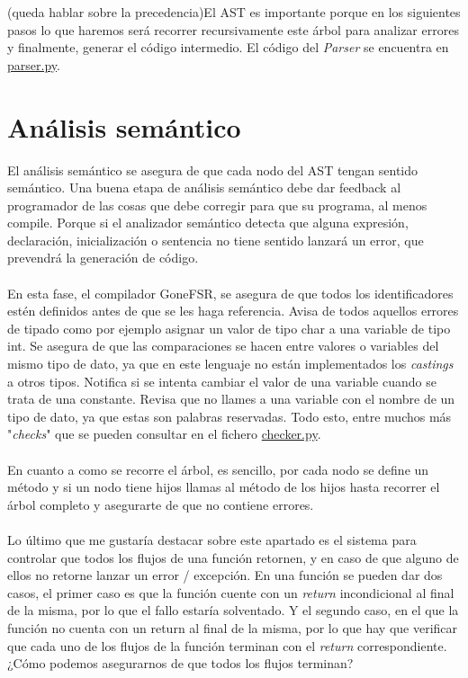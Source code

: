 \newpage
(queda hablar sobre la precedencia)El AST es importante porque en los siguientes pasos lo que haremos será recorrer recursivamente este árbol para analizar errores y finalmente, generar el código intermedio. El código del \textit{Parser} se encuentra en \href{https://github.com/domingoUnican/TFGPedroCastro/blob/main/code/compilerGoneFSR/gone/parser.py}{parser.py}.
\section{Análisis semántico}
El análisis semántico se asegura de que cada nodo del AST tengan sentido semántico. Una buena etapa de análisis semántico debe dar feedback al programador de las cosas que debe corregir para que su programa, al menos compile. Porque si el analizador semántico detecta que alguna expresión, declaración, inicialización o sentencia no tiene sentido lanzará un error, que prevendrá la generación de código.  \\\\
En esta fase, el compilador GoneFSR, se asegura de que todos los identificadores estén definidos antes de que se les haga referencia. Avisa de todos aquellos errores de tipado como por ejemplo asignar un valor de tipo char a una variable de tipo int. Se asegura de que las comparaciones se hacen entre valores o variables del mismo tipo de dato, ya que en este lenguaje no están implementados los \textit{castings} a otros tipos. Notifica si se intenta cambiar el valor de una variable cuando se trata de una constante. Revisa que no llames a una variable con el nombre de un tipo de dato, ya que estas son palabras reservadas. Todo esto, entre muchos más "\textit{checks}" que se pueden consultar en el fichero \href{https://github.com/domingoUnican/TFGPedroCastro/blob/main/code/compilerGoneFSR/gone/checker.py}{checker.py}.
\\\\
En cuanto a como se recorre el árbol, es sencillo, por cada nodo se define un método y si un nodo tiene hijos llamas al método de los hijos hasta recorrer el árbol completo y asegurarte de que no contiene errores.\\\\
Lo último que me gustaría destacar sobre este apartado es el sistema para controlar que todos los flujos de una función retornen, y en caso de que alguno de ellos no retorne lanzar un error / excepción. En una función se pueden dar dos casos, el primer caso es que la función cuente con un \textit{return} incondicional al final de la misma, por lo que el fallo estaría solventado. Y el segundo caso, en el que la función no cuenta con un return al final de la misma, por lo que hay que verificar que cada uno de los flujos de la función terminan con el \textit{return} correspondiente. ¿Cómo podemos asegurarnos de que todos los flujos terminan? \\\\ 
